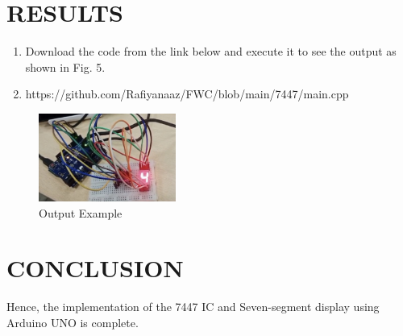 \documentclass[conference]{IEEEtran}
\begin{document}
\section{RESULTS}
\begin{enumerate}
\item Download the code from the link below and execute it to see the output as shown in Fig. 5.
\item https://github.com/Rafiyanaaz/FWC/blob/main/7447/main.cpp
\end{enumerate}

\begin{figure}[htbp] 
\centering 
\includegraphics[width=0.4\textwidth]{744706.jpg}
\caption{\label{fig:Gates} Output Example}    
\end{figure}

\section{CONCLUSION}
Hence, the implementation of the 7447 IC and Seven-segment display using Arduino UNO is complete.
\end{document}

